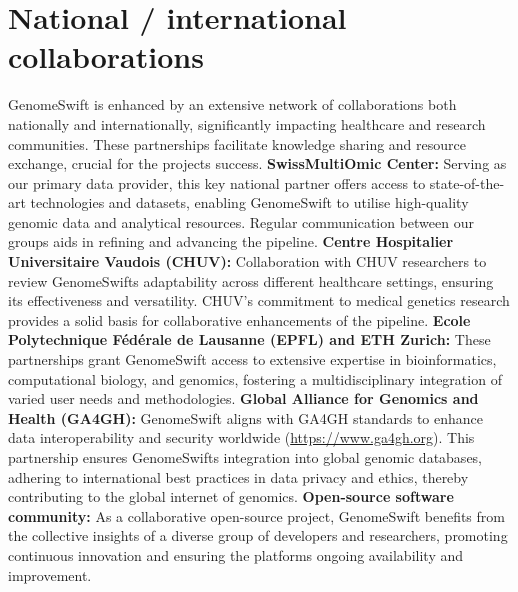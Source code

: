 \hypertarget{national-international-collaborations}{%
\section{National / international
collaborations}\label{national-international-collaborations}}

GenomeSwift is enhanced by an extensive network of collaborations both
nationally and internationally, significantly impacting healthcare and
research communities. These partnerships facilitate knowledge sharing
and resource exchange, crucial for the project\textquotesingle s
success. \textbf{SwissMultiOmic Center:} Serving as our primary data
provider, this key national partner offers access to state-of-the-art
technologies and datasets, enabling GenomeSwift to utilise high-quality
genomic data and analytical resources. Regular communication between our
groups aids in refining and advancing the pipeline. \textbf{Centre
Hospitalier Universitaire Vaudois (CHUV):} Collaboration with CHUV
researchers to review GenomeSwift\textquotesingle s adaptability across
different healthcare settings, ensuring its effectiveness and
versatility. CHUV's commitment to medical genetics research provides a
solid basis for collaborative enhancements of the pipeline.
\textbf{Ecole Polytechnique Fédérale de Lausanne (EPFL) and ETH Zurich:}
These partnerships grant GenomeSwift access to extensive expertise in
bioinformatics, computational biology, and genomics, fostering a
multidisciplinary integration of varied user needs and methodologies.
\textbf{Global Alliance for Genomics and Health (GA4GH):} GenomeSwift
aligns with GA4GH standards to enhance data interoperability and
security worldwide (\url{https://www.ga4gh.org}). This partnership
ensures GenomeSwift\textquotesingle s integration into global genomic
databases, adhering to international best practices in data privacy and
ethics, thereby contributing to the global \textquotesingle internet of
genomics\textquotesingle. \textbf{Open-source software community:} As a
collaborative open-source project, GenomeSwift benefits from the
collective insights of a diverse group of developers and researchers,
promoting continuous innovation and ensuring the
platform\textquotesingle s ongoing availability and improvement.